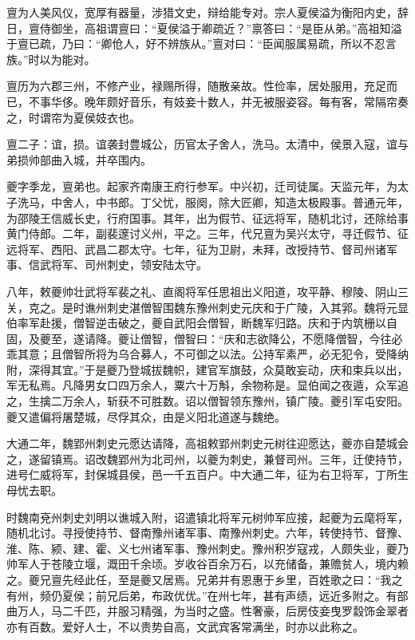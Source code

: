 \documentclass[12pt,UTF8]{ctexbook}
\begin{document}
亶为人美风仪，宽厚有器量，涉猎文史，辩给能专对。宗人夏侯溢为衡阳内史，辞日，亶侍御坐，高祖谓亶曰：“夏侯溢于卿疏近？”禀答曰：“是臣从弟。”高祖知溢于亶已疏，乃曰：“卿伧人，好不辨族从。”亶对曰：“臣闻服属易疏，所以不忍言族。”时以为能对。

亶历为六郡三州，不修产业，禄赐所得，随散亲故。性俭率，居处服用，充足而已，不事华侈。晚年颇好音乐，有妓妾十数人，并无被服姿容。每有客，常隔帘奏之，时谓帘为夏侯妓衣也。

亶二子：谊，损。谊袭封豊城公，历官太子舍人，洗马。太清中，侯景入寇，谊与弟损帅部曲入城，并卒围内。

夔字季龙，亶弟也。起家齐南康王府行参军。中兴初，迁司徒属。天监元年，为太子洗马，中舍人，中书郎。丁父忧，服阕，除大匠卿，知造太极殿事。普通元年，为邵陵王信威长史，行府国事。其年，出为假节、征远将军，随机北讨，还除给事黄门侍郎。二年，副裴邃讨义州，平之。三年，代兄亶为吴兴太守，寻迁假节、征远将军、西阳、武昌二郡太守。七年，征为卫尉，未拜，改授持节、督司州诸军事、信武将军、司州刺史，领安陆太守。

八年，敕夔帅壮武将军裴之礼、直阁将军任思祖出义阳道，攻平静、穆陵、阴山三关，克之。是时谯州刺史湛僧智围魏东豫州刺史元庆和于广陵，入其郛。魏将元显伯率军赴援，僧智逆击破之，夔自武阳会僧智，断魏军归路。庆和于内筑栅以自固，及夔至，遂请降。夔让僧智，僧智曰：“庆和志欲降公，不愿降僧智，今往必乖其意；且僧智所将为乌合募人，不可御之以法。公持军素严，必无犯令，受降纳附，深得其宜。”于是夔乃登城拔魏帜，建官军旗鼓，众莫敢妄动，庆和束兵以出，军无私焉。凡降男女口四万余人，粟六十万斛，余物称是。显伯闻之夜遁，众军追之，生擒二万余人，斩获不可胜数。诏以僧智领东豫州，镇广陵。夔引军屯安阳。夔又遣偏将屠楚城，尽俘其众，由是义阳北道遂与魏绝。

大通二年，魏郢州刺史元愿达请降，高祖敕郢州刺史元树往迎愿达，夔亦自楚城会之，遂留镇焉。诏改魏郢州为北司州，以夔为刺史，兼督司州。三年，迁使持节，进号仁威将军，封保城县侯，邑一千五百户。中大通二年，征为右卫将军，丁所生母忧去职。

时魏南兗州刺史刘明以谯城入附，诏遣镇北将军元树帅军应接，起夔为云麾将军，随机北讨。寻授使持节、督南豫州诸军事、南豫州刺史。六年，转使持节、督豫、淮、陈、颍、建、霍、义七州诸军事、豫州刺史。豫州积岁寇戎，人颇失业，夔乃帅军人于苍陵立堰，溉田千余顷。岁收谷百余万石，以充储备，兼赡贫人，境内赖之。夔兄亶先经此任，至是夔又居焉。兄弟并有恩惠于乡里，百姓歌之曰：“我之有州，频仍夏侯；前兄后弟，布政优优。”在州七年，甚有声绩，远近多附之。有部曲万人，马二千匹，并服习精强，为当时之盛。性奢豪，后房伎妾曳罗縠饰金翠者亦有百数。爱好人士，不以贵势自高，文武宾客常满坐，时亦以此称之。
\end{document}

